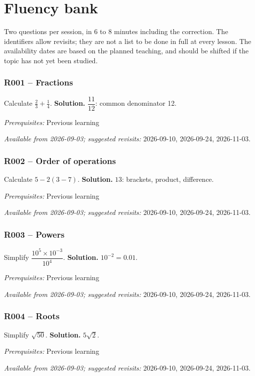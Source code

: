 \chapter{Fluency bank}\label{AUTO}
Two questions per session, in 6 to 8 minutes including the correction. The identifiers allow revisits; they are not a list to be done in full at every lesson. The availability dates are based on the planned teaching, and should be shifted if the topic has not yet been studied.
\subsection*{R001 -- Fractions}\label{R001}
Calculate $\frac23+\frac14$.
\ifprof\textbf{Solution.} $\dfrac{11}{12}$: common denominator 12.\par\textit{Prerequisites:} Previous learning\par\textit{Available from 2026-09-03; suggested revisits:} 2026-09-10, 2026-09-24, 2026-11-03.\fi
{}\subsection*{R002 -- Order of operations}\label{R002}
Calculate $5-2(3-7)$.
\ifprof\textbf{Solution.} $13$: brackets, product, difference.\par\textit{Prerequisites:} Previous learning\par\textit{Available from 2026-09-03; suggested revisits:} 2026-09-10, 2026-09-24, 2026-11-03.\fi
{}\subsection*{R003 -- Powers}\label{R003}
Simplify $\dfrac{10^5\times 10^{-3}}{10^4}$.
\ifprof\textbf{Solution.} $10^{-2}=0.01$.\par\textit{Prerequisites:} Previous learning\par\textit{Available from 2026-09-03; suggested revisits:} 2026-09-10, 2026-09-24, 2026-11-03.\fi
{}\subsection*{R004 -- Roots}\label{R004}
Simplify $\sqrt{50}$.
\ifprof\textbf{Solution.} $5\sqrt2$.\par\textit{Prerequisites:} Previous learning\par\textit{Available from 2026-09-03; suggested revisits:} 2026-09-10, 2026-09-24, 2026-11-03.\fi
